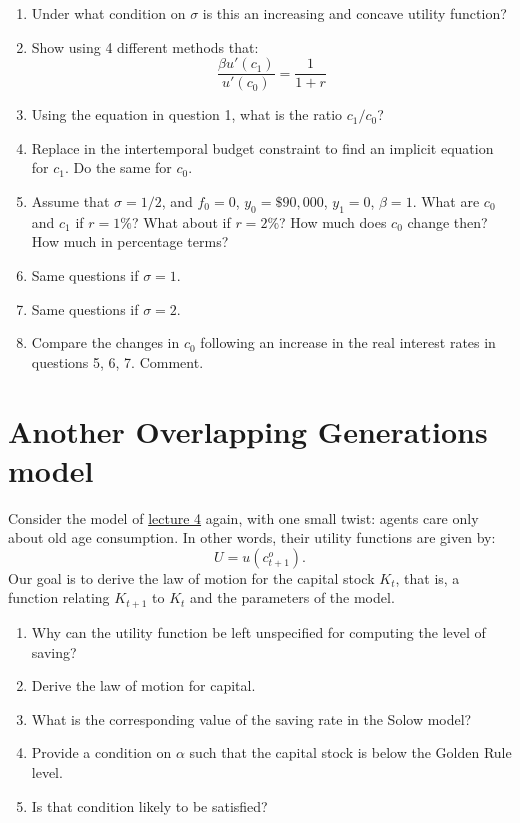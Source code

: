 \documentclass[]{book}
\theoremstyle{definition}
\theoremstyle{definition}
\theoremstyle{definition}
\theoremstyle{remark}
\begin{document}
\begin{enumerate}
\def\labelenumi{\arabic{enumi}.}
\item
  Under what condition on \(\sigma\) is this an increasing and concave
  utility function?
\item
  Show using 4 different methods that:
  \[\frac{\beta u'(c_{1})}{u'(c_{0})}=\frac{1}{1+r}\]
\item
  Using the equation in question 1, what is the ratio \(c_1/c_0\)?
\item
  Replace in the intertemporal budget constraint to find an implicit
  equation for \(c_1\). Do the same for \(c_0\).
\item
  Assume that \(\sigma = 1/2\), and \(f_0=0\), \(y_0=\$90,000\),
  \(y_1=0\), \(\beta = 1\). What are \(c_0\) and \(c_1\) if \(r=1\%\)?
  What about if \(r=2\%\)? How much does \(c_0\) change then? How much
  in percentage terms?
\item
  Same questions if \(\sigma = 1\).
\item
  Same questions if \(\sigma = 2\).
\item
  Compare the changes in \(c_0\) following an increase in the real
  interest rates in questions 5, 6, 7. Comment.
\end{enumerate}

\section{Another Overlapping Generations
model}\label{another-overlapping-generations-model}

Consider the model of \protect\hyperlink{olg}{lecture 4} again, with one
small twist: agents care only about old age consumption. In other words,
their utility functions are given by: \[U=u(c_{t+1}^{o}).\] Our goal is
to derive the law of motion for the capital stock \(K_t\), that is, a
function relating \(K_{t+1}\) to \(K_t\) and the parameters of the
model.

\begin{enumerate}
\def\labelenumi{\arabic{enumi}.}
\item
  Why can the utility function be left unspecified for computing the
  level of saving?
\item
  Derive the law of motion for capital.
\item
  What is the corresponding value of the saving rate in the Solow model?
\item
  Provide a condition on \(\alpha\) such that the capital stock is below
  the Golden Rule level.
\item
  Is that condition likely to be satisfied?
\end{enumerate}
\end{document}

